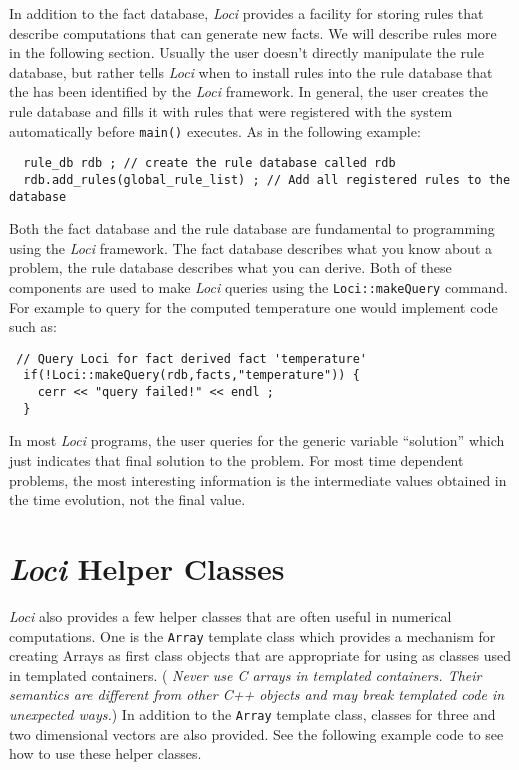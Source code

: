 \documentclass[10pt,epsf,letterpaper,twoside]{book}
\begin{document}
In addition to the fact database, {\it Loci} provides a facility for storing
rules that describe computations that can generate new facts.  We will
describe rules more in the following section.  Usually the user
doesn't directly manipulate the rule database, but rather tells {\it Loci}
when to install rules into the rule database that the has been
identified by the {\it Loci} framework.  In general, the user creates the
rule database and fills it with rules that were registered with the
system automatically before {\tt main()} executes.  As in the
following example:
\begin{verbatim}
  rule_db rdb ; // create the rule database called rdb
  rdb.add_rules(global_rule_list) ; // Add all registered rules to the database
\end{verbatim}
Both the fact database and the rule database are fundamental to
programming using the {\it Loci} framework.  The fact database describes
what you know about a problem, the rule database describes what you
can derive.  Both of these components are used to make {\it Loci} queries
using the {\tt Loci::makeQuery} command.  For example to query for the
computed temperature one would implement code such as:
\begin{verbatim}
 // Query Loci for fact derived fact 'temperature'
  if(!Loci::makeQuery(rdb,facts,"temperature")) {
    cerr << "query failed!" << endl ;
  }
\end{verbatim}
In most {\it Loci} programs, the user queries for the generic variable
``solution'' which just indicates that final solution to the problem.
For most time dependent problems, the most interesting information is
the intermediate values obtained in the time evolution, not the final
value.


\section{{\it Loci} Helper Classes}

{\it Loci} also provides a few helper classes that are often useful in
numerical computations.  One is the {\tt Array} template class which provides a
mechanism for creating Arrays as first class objects that are
appropriate for using as classes used in templated containers. ({\it
Never use C arrays in templated containers.  Their semantics are
different from other C++ objects and may break templated code in
unexpected ways.})  In addition to the {\tt Array} template class,
classes for three and two dimensional vectors are also provided.  See
the following example code to see how to use these helper classes.
\end{document}

